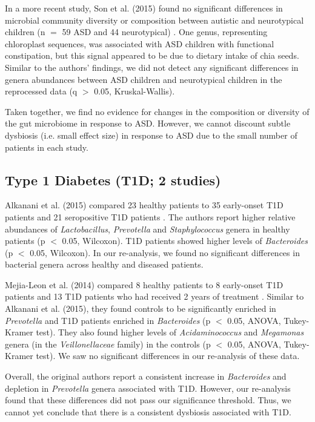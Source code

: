 {In a more recent study, Son et al. (2015) found no significant differences in microbial community diversity or composition between autistic and neurotypical children (n $=$ 59 ASD and 44 neurotypical) \cite{asd-son}.
One genus, representing chloroplast sequences, was associated with ASD children with functional constipation, but this signal appeared to be due to dietary intake of chia seeds.
Similar to the authors’ findings, we did not detect any significant differences in genera abundances between ASD children and neurotypical children in the reprocessed data (q $>$ 0.05, Kruskal-Wallis).

Taken together, we find no evidence for changes in the composition or diversity of the gut microbiome in response to ASD.
However, we cannot discount subtle dysbiosis (i.e. small effect size) in response to ASD due to the small number of patients in each study.

\subsection*{Type 1 Diabetes (T1D; 2 studies)}

Alkanani et al. (2015) compared 23 healthy patients to 35 early-onset T1D patients and 21 seropositive T1D patients \cite{t1d-alkanani}.
The authors report higher relative abundances of \textit{Lactobacillus}, \textit{Prevotella} and \textit{Staphylococcus} genera in healthy patients (p $<$ 0.05, Wilcoxon).
T1D patients showed higher levels of \textit{Bacteroides} (p $<$ 0.05, Wilcoxon).
In our re-analysis, we found no significant differences in bacterial genera across healthy and diseased patients.

Mejia-Leon et al. (2014) compared 8 healthy patients to 8 early-onset T1D patients and 13 T1D patients who had received 2 years of treatment \cite{t1d-mejia}.
Similar to Alkanani et al. (2015), they found controls to be significantly enriched in \textit{Prevotella} and T1D patients enriched in \textit{Bacteroides} (p $<$ 0.05, ANOVA, Tukey-Kramer test).
They also found higher levels of \textit{Acidaminococcus} and \textit{Megamonas} genera (in the \textit{Veillonellaceae} family) in the controls (p $<$ 0.05, ANOVA, Tukey-Kramer test).
We saw no significant differences in our re-analysis of these data.

Overall, the original authors report a consistent increase in \textit{Bacteroides} and depletion in \textit{Prevotella} genera associated with T1D.
However, our re-analysis found that these differences did not pass our significance threshold.
Thus, we cannot yet conclude that there is a consistent dysbiosis associated with T1D.

}
